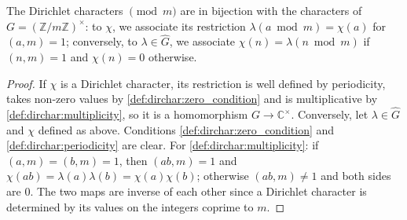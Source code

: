 \begin{lemma}\label{lem:dirchar_group_char}
    The Dirichlet characters $\pmod m$ are in bijection with the characters of $G = \left(\mathbb{Z}/m\mathbb{Z}\right)^\times$: to $\chi$, we associate its restriction $\lambda(a \bmod m) = \chi(a)$ for $(a,m) = 1$; conversely, to $\lambda\in\widehat G$, we associate $\chi(n) = \lambda(n\bmod m)$ if $(n,m) = 1$ and $\chi(n) = 0$ otherwise.
\end{lemma}
\begin{proof}
    If $\chi$ is a Dirichlet character, its restriction is well defined by periodicity, takes non-zero values by \ref{def:dirchar:zero_condition} and is multiplicative by \ref{def:dirchar:multiplicity}, so it is a homomorphism $G\to\mathbb{C}^\times$. Conversely, let $\lambda \in \widehat G$ and $\chi$ defined as above. Conditions \ref{def:dirchar:zero_condition} and \ref{def:dirchar:periodicity} are clear. For \ref{def:dirchar:multiplicity}: if $(a,m) = (b,m) = 1$, then $(ab,m) = 1$ and $\chi(ab) = \lambda(a)\lambda(b) = \chi(a)\chi(b)$; otherwise $(ab,m)\neq1$ and both sides are $0$. The two maps are inverse of each other since a Dirichlet character is determined by its values on the integers coprime to $m$.
\end{proof}


